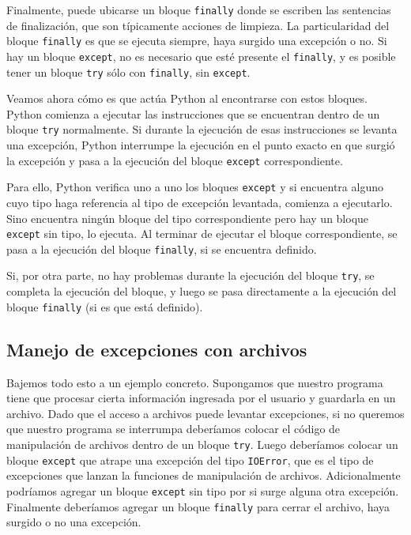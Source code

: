 Finalmente, puede ubicarse un bloque \lstinline!finally! donde se escriben
las sentencias de finalización, que son típicamente acciones de limpieza.
La particularidad del bloque \lstinline!finally! es que se ejecuta siempre,
haya surgido una excepción o no. Si hay un bloque \lstinline!except!, no es
necesario que esté presente el \lstinline!finally!, y es posible tener un
bloque \lstinline!try! sólo con \lstinline!finally!, sin
\lstinline!except!.

Veamos ahora cómo es que actúa Python al encontrarse con estos bloques. Python
comienza a ejecutar las instrucciones que se encuentran dentro de un bloque
\lstinline!try! normalmente. Si durante la ejecución de esas instrucciones
se levanta una excepción, Python interrumpe la ejecución en el
punto exacto en que surgió la excepción y pasa a la ejecución del bloque
\lstinline!except! correspondiente.

Para ello, Python verifica uno a uno los bloques \lstinline!except! y si
encuentra alguno cuyo tipo haga referencia al tipo de excepción levantada,
comienza a ejecutarlo. Sino encuentra ningún bloque del tipo
correspondiente pero hay un bloque \lstinline!except! sin tipo, lo
ejecuta. Al terminar de ejecutar el bloque correspondiente, se pasa a la
ejecución del bloque \lstinline!finally!, si se encuentra definido.

Si, por otra parte, no hay problemas durante la ejecución del bloque
\lstinline!try!, se completa la ejecución del bloque, y luego se pasa
directamente a la ejecución del bloque \lstinline!finally! (si es que está
definido).

\subsection{Manejo de excepciones con archivos}

Bajemos todo esto a un ejemplo concreto. Supongamos que nuestro programa
tiene que procesar cierta información ingresada por el usuario y guardarla
en un archivo. Dado que el acceso a archivos puede levantar
excepciones, si no queremos que nuestro programa se interrumpa
deberíamos colocar el código de manipulación de
archivos dentro de un bloque \lstinline!try!. Luego deberíamos
colocar un bloque \lstinline!except! que atrape una excepción del tipo
\lstinline!IOError!, que es el tipo de excepciones que lanzan la funciones
de manipulación de archivos. Adicionalmente podríamos agregar un bloque
\lstinline!except! sin tipo por si surge alguna otra excepción.  Finalmente
deberíamos agregar un bloque \lstinline!finally! para cerrar el archivo,
haya surgido o no una excepción.

